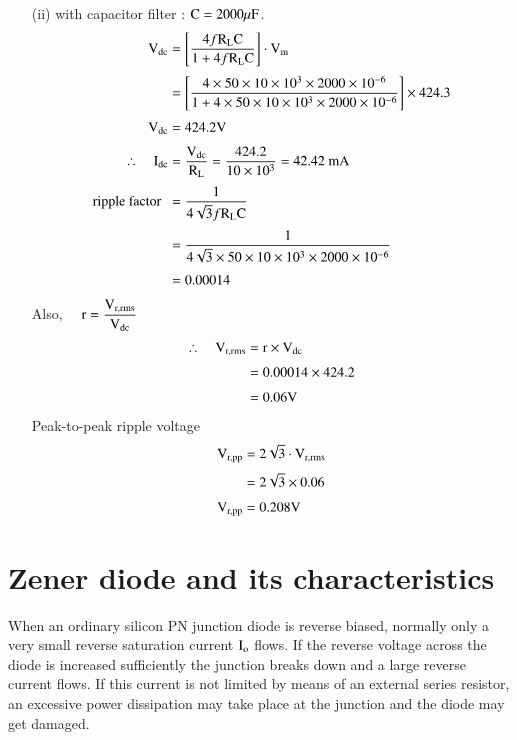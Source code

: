 \begin{solution}
\begin{itemize}
\item[(ii)] with capacitor filter : $\textrm{C}=2000\mu\textrm{F}$.
\begin{align*}
\textrm{V}_{\text{dc}} &= \left[\frac{4f\textrm{R}_{\textrm{L}}\textrm{C}}{1+4f\textrm{R}_{\textrm{L}}\textrm{C}}\right]\cdot \textrm{V}_{\textrm{m}}\\[3pt]
&= \left[\frac{4\times 50\times 10\times 10^{3}\times 2000\times 10^{-6}}{1+4\times 50\times 10\times 10^{3}\times 2000\times 10^{-6}}\right]\times 424.3\\[3pt]
\textrm{V}_{\text{dc}} &= 424.2\textrm{V}\\[3pt]
\therefore\quad \textrm{I}_{\text{dc}} &= \frac{\textrm{V}_{\text{dc}}}{\textrm{R}_{\textrm{L}}}=\dfrac{424.2}{10\times 10^{3}}=42.42\text{~mA}\\[3pt]
\text{ripple factor~ } &= \frac{1}{4\sqrt{3}f\textrm{R}_{\textrm{L}}\textrm{C}}\\[3pt]
&= \frac{1}{4\sqrt{3}\times 50\times 10\times 10^{3}\times 2000\times 10^{-6}}\\[3pt]
&= 0.00014
\end{align*}
Also, \ \ $\textrm{r}=\dfrac{\textrm{V}_{\text{r,rms}}}{\textrm{V}_{\text{dc}}}$
\begin{align*}
\therefore\quad \textrm{V}_{\text{r,rms}} &= \textrm{r}\times \textrm{V}_{\text{dc}}\\[3pt]
&= 0.00014\times 424.2\\[3pt]
&= 0.06\textrm{V}
\end{align*}
Peak-to-peak ripple voltage
\begin{align*}
\textrm{V}_{\text{r,pp}} &= 2\sqrt{3}\cdot \textrm{V}_{\text{r,rms}}\\[3pt]
                &= 2\sqrt{3}\times 0.06\\[3pt]
\textrm{V}_{\text{r,pp}} &= 0.208\textrm{V}
\end{align*}
\end{itemize}
\end{solution}

\section{Zener diode and its characteristics}\label{sec1.12}

When an ordinary silicon PN junction diode is reverse biased, normally only a very small reverse saturation current $\textrm{I}_{\textrm{o}}$ flows. If the reverse voltage across the diode is increased sufficiently the junction breaks down and a large reverse current flows. If this current is not limited by means of an external series resistor, an excessive power dissipation may take place at the junction and the diode may get damaged.

